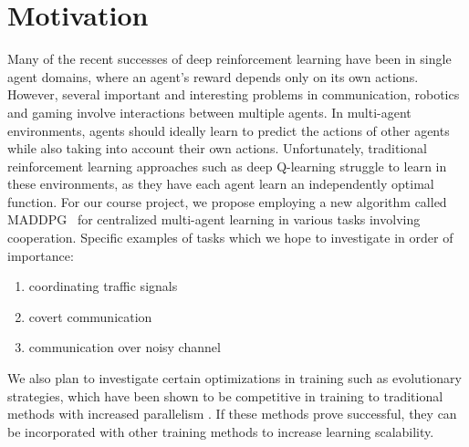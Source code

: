 
\section{Motivation}
\label{sec:motivation}

Many of the recent successes of deep reinforcement learning have been in
single agent domains, where an agent's reward depends only on its own actions.
However, several important and interesting problems in communication, robotics
and gaming involve interactions between multiple agents. In multi-agent
environments, agents should ideally learn to predict the actions of other
agents while also taking into account their own actions. Unfortunately, traditional
reinforcement learning approaches such as deep Q-learning struggle to learn in
these environments, as they have each agent learn an independently optimal
function. For our course project, we propose employing a new algorithm called
MADDPG~\cite{lowe2017multi} for centralized multi-agent learning in various
tasks involving cooperation.
Specific examples of tasks which we hope to investigate in order of importance:
\begin{enumerate}
  \item coordinating traffic signals
  \item covert communication
  \item communication over noisy channel
\end{enumerate}

We also plan to investigate certain optimizations in training such as evolutionary strategies, which have been shown to be competitive in training to traditional methods with increased parallelism \cite{salimans2017evolution}.
If these methods prove successful, they can be incorporated with other training methods to increase learning scalability.
